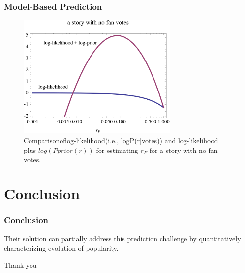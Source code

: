 \documentclass[aspectratio=43]{beamer}
\begin{document}
\begin{frame}
\frametitle{Model-Based Prediction}
\centering
\begin{minipage}{\textwidth}
\begin{figure}
\centering
\includegraphics[width=0.7\textwidth]{fig13.PNG}
\caption{Comparisonoflog-likelihood(i.e., logP(r|votes)) and log-likelihood plus $log\left(P prior \left(r\right)\right)$ for estimating $r_F$ for a story with no fan votes.}
\end{figure}
\end{minipage}
\end{frame}

\section[Conclusion]{Conclusion}
\begin{frame}
\frametitle{Conclusion}
\centering
\begin{minipage}{\textwidth}
Their solution can partially address this prediction challenge by quantitatively characterizing evolution of popularity.
\end{minipage}
\end{frame}

\begin{frame}

\begin{center}
\Huge Thank you
\end{center}

\end{frame}
\end{document}
